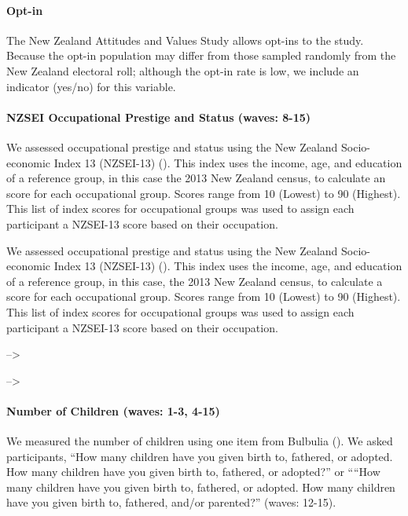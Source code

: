 \documentclass[
  singlecolumn]{article}
\let\oldparagraph\paragraph
\renewcommand{\paragraph}[1]{\oldparagraph{#1}\mbox{}}
\begin{document}
\paragraph{Opt-in}\label{opt-in}

The New Zealand Attitudes and Values Study allows opt-ins to the study.
Because the opt-in population may differ from those sampled randomly
from the New Zealand electoral roll; although the opt-in rate is low, we
include an indicator (yes/no) for this variable.

\paragraph{NZSEI Occupational Prestige and Status (waves:
8-15)}\label{nzsei-occupational-prestige-and-status-waves-8-15}

We assessed occupational prestige and status using the New Zealand
Socio-economic Index 13 (NZSEI-13) (). This index uses the income, age, and education of
a reference group, in this case the 2013 New Zealand census, to
calculate an score for each occupational group. Scores range from 10
(Lowest) to 90 (Highest). This list of index scores for occupational
groups was used to assign each participant a NZSEI-13 score based on
their occupation.

We assessed occupational prestige and status using the New Zealand
Socio-economic Index 13 (NZSEI-13) (). This index uses the income, age, and education of
a reference group, in this case, the 2013 New Zealand census, to
calculate a score for each occupational group. Scores range from 10
(Lowest) to 90 (Highest). This list of index scores for occupational
groups was used to assign each participant a NZSEI-13 score based on
their occupation.

--\textgreater{}

--\textgreater{}

\paragraph{Number of Children (waves: 1-3,
4-15)}\label{number-of-children-waves-1-3-4-15}

We measured the number of children using one item from Bulbulia
(). We asked participants, ``How many
children have you given birth to, fathered, or adopted. How many
children have you given birth to, fathered, or adopted?'' or ````How
many children have you given birth to, fathered, or adopted. How many
children have you given birth to, fathered, and/or parented?'' (waves:
12-15).
\end{document}
